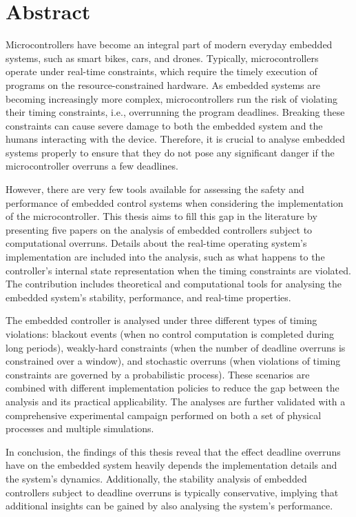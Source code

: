 \chapter*{Abstract}

Microcontrollers have become an integral part of modern everyday embedded systems, such as smart bikes, cars, and drones.
Typically, microcontrollers operate under real-time constraints, which require the timely execution of programs on the resource-constrained hardware.
As embedded systems are becoming increasingly more complex, microcontrollers run the risk of violating their timing constraints, i.e., overrunning the program deadlines.
Breaking these constraints can cause severe damage to both the embedded system and the humans interacting with the device.
Therefore, it is crucial to analyse embedded systems properly to ensure that they do not pose any significant danger if the microcontroller overruns a few deadlines.

However, there are very few tools available for assessing the safety and performance of embedded control systems when considering the implementation of the microcontroller.
This thesis aims to fill this gap in the literature by presenting five papers on the analysis of embedded controllers subject to computational overruns.
Details about the real-time operating system's implementation are included into the analysis, such as what happens to the controller's internal state representation when the timing constraints are violated.
The contribution includes theoretical and computational tools for analysing the embedded system's stability, performance, and real-time properties.

The embedded controller is analysed under three different types of timing violations: blackout events (when no control computation is completed during long periods), weakly-hard constraints (when the number of deadline overruns is constrained over a window), and stochastic overruns (when violations of timing constraints are governed by a probabilistic process).
These scenarios are combined with different implementation policies to reduce the gap between the analysis and its practical applicability.
The analyses are further validated with a comprehensive experimental campaign performed on both a set of physical processes and multiple simulations.

In conclusion, the findings of this thesis reveal that the effect deadline overruns have on the embedded system heavily depends the implementation details and the system's dynamics.
Additionally, the stability analysis of embedded controllers subject to deadline overruns is typically conservative, implying that additional insights can be gained by also analysing the system's performance.



